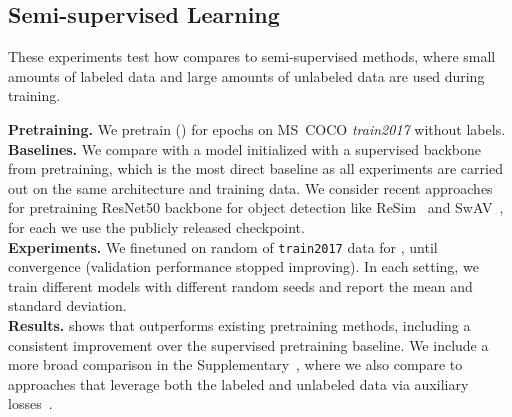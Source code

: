 \subsection{Semi-supervised Learning}
These experiments test how \model compares to semi-supervised methods, where small amounts of labeled data and large amounts of unlabeled data are used during training.

\noindent\textbf{Pretraining.} We pretrain \model () for  epochs on MS~COCO \textit{train2017} without labels. 
\vspace{0.1cm}
\\
\noindent\textbf{Baselines.} We compare \model with a 
 model initialized with a supervised backbone from \imagenetthousand pretraining, which is the most direct baseline as all experiments are carried out on the same architecture and training data. We consider recent approaches for pretraining ResNet50 backbone for object detection like ReSim~\cite{xiao2021region} and SwAV~\cite{caron2020unsupervised}, for each we use the publicly released checkpoint.
\vspace{0.1cm}
\\
\noindent\textbf{Experiments.} We finetuned \model on random  of \texttt{train2017} data for , until convergence (validation performance stopped improving). In each setting, we train  different models with different random seeds and report the mean and standard deviation.
\vspace{0.1cm}
\\
\noindent\textbf{Results.}  shows that \model outperforms existing pretraining methods, including a consistent improvement over the supervised pretraining baseline. We include a more broad comparison in the Supplementary~, where we also compare to approaches that leverage both the labeled and unlabeled data via auxiliary losses~\cite{jeong2019consistency,sohn2020simple, liu2021unbiased, xu2021end}.



